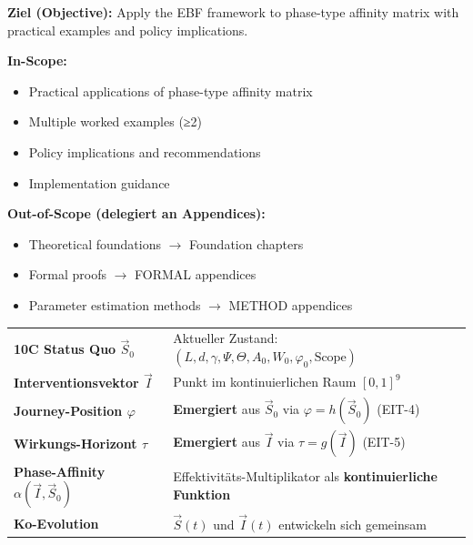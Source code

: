 \begin{tcolorbox}[
    colback=purple!5!white,
    colframe=purple!75!black,
    title={\textbf{Chapter Scope: Ziel / In-Scope / Out-of-Scope}},
    fonttitle=\bfseries
]

\textbf{Ziel (Objective):}
Apply the EBF framework to phase-type affinity matrix with practical examples and policy implications.

\vspace{0.3cm}
\textbf{In-Scope:}
\begin{itemize}[nosep]
    \item Practical applications of phase-type affinity matrix
    \item Multiple worked examples (≥2)
    \item Policy implications and recommendations
    \item Implementation guidance
\end{itemize}

\vspace{0.3cm}
\textbf{Out-of-Scope (delegiert an Appendices):}
\begin{itemize}[nosep]
    \item Theoretical foundations $\rightarrow$ Foundation chapters
    \item Formal proofs $\rightarrow$ FORMAL appendices
    \item Parameter estimation methods $\rightarrow$ METHOD appendices
\end{itemize}

\end{tcolorbox}



\begin{tcolorbox}[colback=blue!5!white, colframe=blue!75!black,
    title=Zentrale Begriffe in diesem Kapitel]
\small
\begin{tabular}{@{}ll@{}}
\textbf{10C Status Quo $\vec{S}_0$} & Aktueller Zustand: $(L, d, \gamma, \Psi, \Theta, A_0, W_0, \varphi_0, \text{Scope})$ \\
\textbf{Interventionsvektor $\vec{I}$} & Punkt im kontinuierlichen Raum $[0,1]^9$ \\
\textbf{Journey-Position $\varphi$} & \textbf{Emergiert} aus $\vec{S}_0$ via $\varphi = h(\vec{S}_0)$ (EIT-4) \\
\textbf{Wirkungs-Horizont $\tau$} & \textbf{Emergiert} aus $\vec{I}$ via $\tau = g(\vec{I})$ (EIT-5) \\
\textbf{Phase-Affinity $\alpha(\vec{I}, \vec{S}_0)$} & Effektivit\"{a}ts-Multiplikator als \textbf{kontinuierliche Funktion} \\
\textbf{Ko-Evolution} & $\vec{S}(t)$ und $\vec{I}(t)$ entwickeln sich gemeinsam \\
\end{tabular}
\end{tcolorbox}

